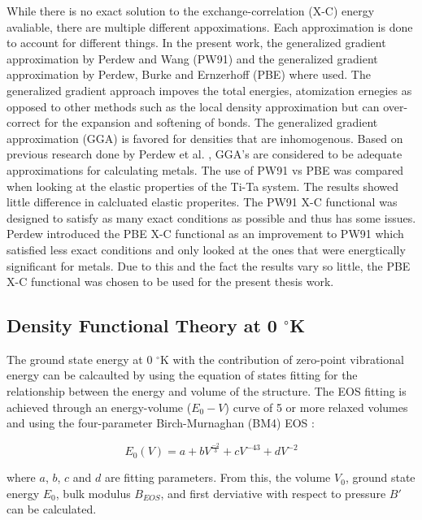 While there is no exact solution to the exchange-correlation (X-C) energy avaliable, there are multiple different appoximations. Each approximation is done to account for different things. In the present work, the generalized gradient approximation by Perdew and Wang (PW91) \cite{Perdew1992} and the generalized gradient approximation by Perdew, Burke and Ernzerhoff (PBE) \cite{Perdew1996a} where used. The generalized gradient approach impoves the total energies, atomization ernegies as opposed to other methods such as the local density approximation \cite{Ceperley1980} but can over-correct for the expansion and softening of bonds. The generalized gradient approximation (GGA) is favored for densities that are inhomogenous. Based on previous research done by Perdew et al. \cite{Perdew1996a}, GGA's are considered to be adequate approximations for calculating metals. The use of PW91 vs PBE was compared when looking at the elastic properties of the Ti-Ta system. The results showed little difference in calcluated elastic properites. The PW91 X-C functional was designed to satisfy as many exact conditions as possible and thus has some issues. Perdew introduced the PBE X-C functional as an improvement to PW91 which satisfied less exact conditions and only looked at the ones that were energtically significant for metals. Due to this and the fact the results vary so little, the PBE X-C functional was chosen to be used for the present thesis work.  



\subsection{Density Functional Theory at 0 $^\circ$K}

 The ground state energy at 0 $^\circ$K with the contribution of zero-point vibrational energy can be calcaulted by using the equation of states fitting for the relationship between the energy and volume of the structure. The EOS fitting is achieved through an energy-volume ($E_{0}-V$) curve of 5 or more relaxed volumes and using the four-parameter Birch-Murnaghan (BM4) EOS \cite{Shang2010}:

\begin{equation}
\label{eq: zeroenergy}
E_{0}(V) = a + bV^{\frac{-2}{3}} + cV^{{-4}{3}} + dV^{-2}
\end{equation}

\noindent where $a$, $b$, $c$ and $d$ are fitting parameters. From this, the volume $V_0$, ground state energy $E_{0}$, bulk modulus $B_{EOS}$, and first derviative with respect to pressure $B'$ can be calculated. 


